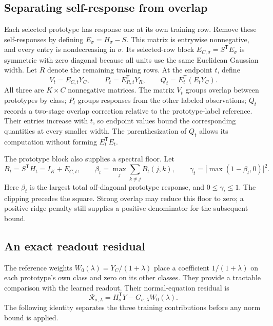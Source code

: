\documentclass[preprint,12pt,authoryear]{elsarticle}
\newcommand{\tr}{\mathsf{T}}
\begin{document}
\subsection{Separating self-response from overlap}
Each selected prototype has response one at its own training row. Remove these self-responses by defining $E_\sigma=H_\sigma-S$. This matrix is entrywise nonnegative, and every entry is nondecreasing in $\sigma$. Its selected-row block $E_{C,\sigma}=S^\tr E_\sigma$ is symmetric with zero diagonal because all units use the same Euclidean Gaussian width. Let $R$ denote the remaining training rows. At the endpoint $t$, define
\begin{equation}
 V_t=E_{C,t}Y_C,\qquad
 P_t=E_{R,t}^\tr Y_R,\qquad
 Q_t=E_t^\tr(E_tY_C).
 \label{eq:terms}
\end{equation}
All three are $K\times C$ nonnegative matrices. The matrix $V_t$ groups overlap between prototypes by class; $P_t$ groups responses from the other labeled observations; $Q_t$ records a two-stage overlap correction relative to the prototype-label reference. Their entries increase with $t$, so endpoint values bound the corresponding quantities at every smaller width. The parenthesization of $Q_t$ allows its computation without forming $E_t^\tr E_t$.

The prototype block also supplies a spectral floor. Let
\begin{equation}
 B_t=S^\tr H_t=I_K+E_{C,t},\qquad
 \beta_t=\max_j\sum_{k\ne j}B_t(j,k),\qquad
 \gamma_t=\bigl[\max(1-\beta_t,0)\bigr]^2.
 \label{eq:spectral}
\end{equation}
Here $\beta_t$ is the largest total off-diagonal prototype response, and $0\leq\gamma_t\leq1$. The clipping precedes the square. Strong overlap may reduce this floor to zero; a positive ridge penalty still supplies a positive denominator for the subsequent bound.

\subsection{An exact readout residual}
The reference weights $W_0(\lambda)=Y_C/(1+\lambda)$ place a coefficient $1/(1+\lambda)$ on each prototype's own class and zero on its other classes. They provide a tractable comparison with the learned readout. Their normal-equation residual is
\begin{equation}
 \mathcal R_{\sigma,\lambda}
 =H_\sigma^\tr Y-G_{\sigma,\lambda}W_0(\lambda).
 \label{eq:residualdef}
\end{equation}
The following identity separates the three training contributions before any norm bound is applied.
\end{document}
